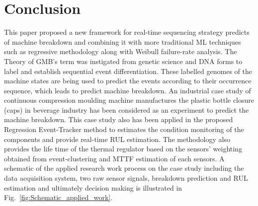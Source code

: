 \documentclass[conference]{IEEEtran}
\begin{document}
\section{Conclusion}
\label{sec:conclusion}
This paper proposed a new framework for real-time sequencing strategy predicts of machine breakdown and combining it with more traditional ML techniques such as regressive methodology along with Weibull failure-rate analysis. The Theory of GMB's term was instigated from genetic science and DNA forms to label and establish sequential event differentiation. These labelled genomes of the machine states are being used to predict the events according to their occurrence sequence, which leads to predict machine breakdown. An industrial case study of continuous compression moulding machine manufactures the plastic bottle closure (caps) in beverage industry has been considered as an experiment to predict the machine breakdown. This case study also has been applied in the proposed Regression Event-Tracker method to estimates the condition monitoring of the components and provide real-time RUL estimation. The methodology also provides the life time of the thermal regulator based on the sensors' weighting obtained from event-clustering and MTTF estimation of each sensors. A schematic of the applied research work process on the case study including the data acquisition system, two raw sensor signals, breakdown prediction and RUL estimation and ultimately decision making is illustrated in Fig.~\ref{fig:Schematic_applied_work}.
\end{document}

